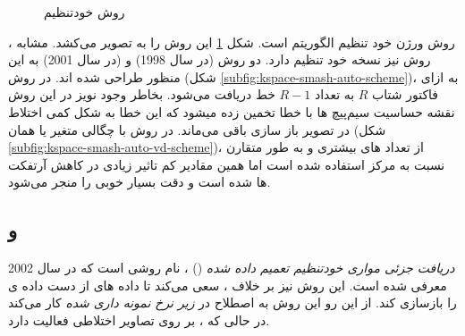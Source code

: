 \begin{figure}[t!]
	\centering
	\removevspace[1]
	\caption{روش خودتنظیم }
	\label{fig:kspace-mSENSE-scheme}
\end{figure}




روش 
ورژن خود تنظیم الگوریتم 
است. شکل \ref{fig:kspace-mSENSE-scheme}
این روش را به تصویر می‌کشد. مشابه ، روش 
نیز نسخه خود تنظیم دارد. دو روش 
(در سال 1998)
و 
(در سال 2001)
به این منظور طراحی شده اند. در روش  (شکل \ref{subfig:kspace-smash-auto-scheme})، به ازای فاکتور شتاب $R$ به تعداد $R-1$ خط 
دریافت می‌شود. بخاطر وجود نویز در این روش نقشه حساسیت سیم‌پیچ ها با خطا تخمین زده میشود که این خطا به شکل کمی اختلاط در تصویر باز سازی باقی می‌ماند. در روش  با چگالی متغیر یا همان 
(شکل \ref{subfig:kspace-smash-auto-vd-scheme})، از تعداد 
های بیشتری و به طور متقارن نسبت به مرکز \kspace استفاده شده است اما همین مقادیر کم تاثیر زیادی در کاهش آرتفکت ها شده است و دقت بسیار خوبی را منجر می‌شود.

\FloatBarrier
\subsection{ و }
\textit{دریافت جزئی مواری خودتنظیم تعمیم داده شده}
()
، نام روشی است که در سال 2002 معرفی شده است.
\cite{GRAPPA-Griswold2002}
 این روش نیز بر خلاف 
 ، سعی می‌کند تا داده های از دست داده ی \kspace را بازسازی کند. از این رو این روش به اصطلاح در \textit{\kspace زیر نرخ نمونه داری شده}
کار می‌کند در حالی که ، بر روی تصاویر اختلاطی فعالیت دارد.

